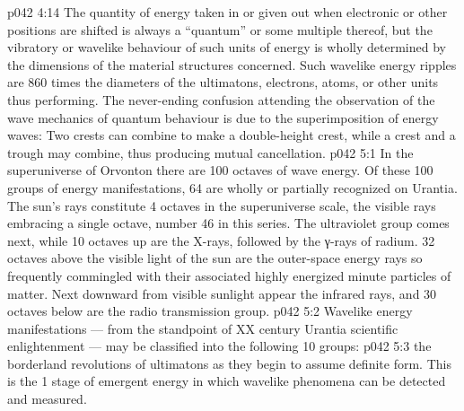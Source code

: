 \vs p042 4:14 The quantity of energy taken in or given out when electronic or other positions are shifted is always a “quantum” or some multiple thereof, but the vibratory or wavelike behaviour of such units of energy is wholly determined by the dimensions of the material structures concerned. Such wavelike energy ripples are 860 times the diameters of the ultimatons, electrons, atoms, or other units thus performing. The never\hyp{}ending confusion attending the observation of the wave mechanics of quantum behaviour is due to the superimposition of energy waves: Two crests can combine to make a double\hyp{}height crest, while a crest and a trough may combine, thus producing mutual cancellation.
\vs p042 5:1 In the superuniverse of Orvonton there are 100 octaves of wave energy. Of these 100 groups of energy manifestations, 64 are wholly or partially recognized on Urantia. The sun’s rays constitute 4 octaves in the superuniverse scale, the visible rays embracing a single octave, number 46 in this series. The ultraviolet group comes next, while 10 octaves up are the X\hyp{}rays, followed by the γ-rays of radium. 32 octaves above the visible light of the sun are the outer\hyp{}space energy rays so frequently commingled with their associated highly energized minute particles of matter. Next downward from visible sunlight appear the infrared rays, and 30 octaves below are the radio transmission group.
\vs p042 5:2 \pc Wavelike energy manifestations --- from the standpoint of XX century Urantia scientific enlightenment --- may be classified into the following 10 groups:
\vs p042 5:3 \bibnobreakspace {} the borderland revolutions of ultimatons as they begin to assume definite form. This is the 1 stage of emergent energy in which wavelike phenomena can be detected and measured.
